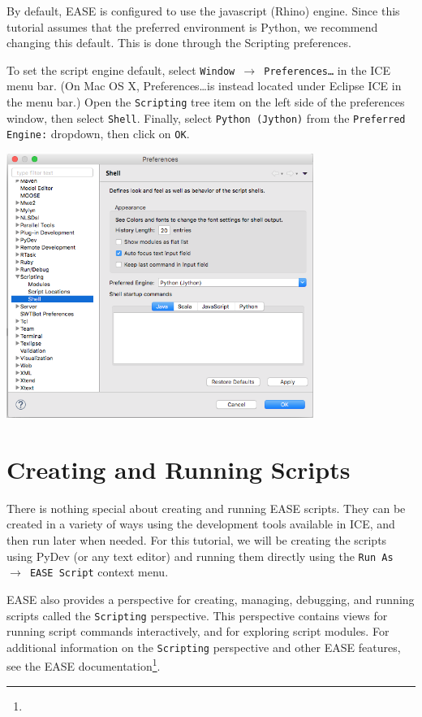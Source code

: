 By default, EASE is configured to use the javascript (Rhino) engine. Since this
tutorial assumes that the preferred environment is Python, we recommend changing
this default. This is done through the Scripting preferences.

To set the script engine default, select \texttt{Window $\rightarrow$
Preferences\ldots} in the ICE menu bar. (On Mac OS X, Preferences\ldots is
instead located under Eclipse ICE in the menu bar.) Open the \texttt{Scripting}
tree item on the left side of the preferences window, then select
\texttt{Shell}. Finally, select \texttt{Python (Jython)} from the
\texttt{Preferred Engine:} dropdown, then click on \texttt{OK}.

\begin{center}
\includegraphics[width=10cm]{images/scripting-prefs}
\end{center}


\section{Creating and Running Scripts}

There is nothing special about creating and running EASE scripts. They can be
created in a variety of ways using the development tools available in ICE, and
then run later when needed. For this tutorial, we will be creating the scripts
using PyDev (or any text editor) and running them directly using the \texttt{Run As
$\rightarrow$ EASE Script} context menu.

EASE also provides a perspective for creating, managing, debugging, and running
scripts called the \texttt{Scripting} perspective. This perspective contains
views for running script commands interactively, and for exploring script modules.
For additional information on the
\texttt{Scripting} perspective and other EASE features, see the EASE
documentation\footnote{}.

